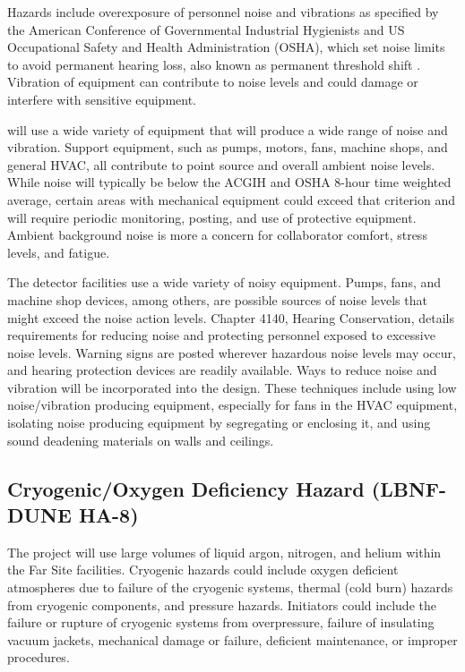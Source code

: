 Hazards include overexposure of personnel noise and vibrations as
specified by the American Conference of Governmental Industrial
Hygienists and US Occupational Safety and Health Administration
(OSHA), which set noise limits to avoid permanent hearing loss, also
known as permanent threshold shift . Vibration of equipment can
contribute to noise levels and could damage or interfere with
sensitive equipment.

 will use a wide variety of equipment that
will produce a wide range of noise and vibration. Support equipment,
such as pumps, motors, fans, machine shops, and general HVAC, all
contribute to point source and overall ambient noise levels. While
noise will typically be below the ACGIH and OSHA 8-hour time weighted
average, certain areas with mechanical equipment could exceed that
criterion and will require periodic monitoring, posting, and use of
protective equipment. Ambient background noise is more a concern for
collaborator comfort, stress levels, and fatigue.

The detector facilities use a wide variety of noisy equipment. Pumps,
fans, and machine shop devices, among others, are possible sources of
noise levels that might exceed the \fnal noise action
levels.  Chapter 4140, Hearing Conservation, details
requirements for reducing noise and protecting personnel exposed to
excessive noise levels. Warning signs are posted wherever hazardous
noise levels may occur, and hearing protection devices are readily
available. Ways to reduce noise and vibration will be incorporated
into the  design. These techniques include
using low noise/vibration producing equipment, especially for fans in
the HVAC equipment, isolating noise producing equipment by segregating
or enclosing it, and using sound deadening materials on walls and
ceilings.

\subsection{Cryogenic/Oxygen Deficiency Hazard (LBNF-DUNE HA-8)}

The  project will use large volumes of liquid
argon, nitrogen, and helium within the Far Site facilities. Cryogenic
hazards could include oxygen deficient atmospheres due to failure of
the cryogenic systems, thermal (cold burn) hazards from cryogenic
components, and pressure hazards. Initiators could include the failure
or rupture of cryogenic systems from overpressure, failure of
insulating vacuum jackets, mechanical damage or failure, deficient
maintenance, or improper procedures.

